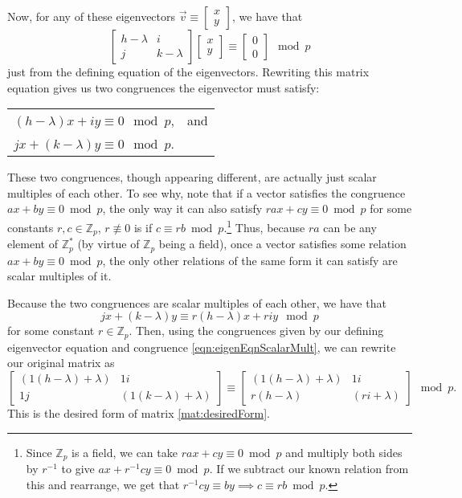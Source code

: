 \documentclass[a4paper, 12pt, reqno]{amsart}
\newcommand{\Z}{\mathbb{Z}}
\newcommand\smallmat[1]{\left[\begin{smallmatrix}#1\end{smallmatrix}\right]}
\begin{document}
	Now, for any of these eigenvectors $\vec{v} \equiv \smallmat{x\\y}$, we have that
	\[
		\begin{bmatrix}h-\lambda & i \\ j & k-\lambda\end{bmatrix}
		\begin{bmatrix}x \\ y\end{bmatrix}
		\equiv
		\begin{bmatrix}0 \\ 0\end{bmatrix}
		\mod{p}
	\]
	just from the defining equation of the eigenvectors. Rewriting this matrix equation gives us two congruences the eigenvector must satisfy:
	\begin{center}
		\begin{tabular}{rl}
			$(h - \lambda)x + iy  \equiv 0 \mod{p}$, & \quad and \\
			$jx + (k - \lambda)y \equiv 0 \mod{p}$. &
		\end{tabular}
	\end{center}
	These two congruences, though appearing different, are actually just scalar multiples of each other. To see why, note that if a vector satisfies the congruence 
	$ax + by \equiv 0 \bmod{p}$, the only way it can also satisfy $rax + cy \equiv 0 \bmod{p}$ for some constants $r, c \in \Z_p$, $r \not\equiv 0$ is if 
	$c \equiv rb \bmod{p}$.\footnote{Since $\Z_p$ is a field, we can take $rax + cy \equiv 0 \bmod{p}$ and multiply both sides by $r^{-1}$ to give 
	$ax + r^{-1}cy \equiv 0 \bmod{p}$. If we subtract our known relation from this and rearrange, we get that $r^{-1}cy \equiv by \implies c \equiv rb \bmod{p}$.} Thus, 
	because $ra$ can be any element of $\Z_p^*$ (by virtue of $\Z_p$ being a field), once a vector satisfies some relation $ax + by \equiv 0 \bmod{p}$, the only other 
	relations of the same form it can satisfy are scalar multiples of it.
	
	Because the two congruences are scalar multiples of each other, we have that
	\begin{equation}
		\label{eqn:eigenEqnScalarMult}
		jx + (k - \lambda)y \equiv r(h - \lambda)x + riy \mod{p}
	\end{equation}
	for some constant $r \in \Z_p$. Then, using the congruences given by our defining eigenvector equation and congruence \ref{eqn:eigenEqnScalarMult}, we can rewrite our
	original matrix as
	\[
		\begin{bmatrix}
			(1(h - \lambda) + \lambda) & 1i \\
			1j & (1(k - \lambda) + \lambda)
		\end{bmatrix} 
		\equiv
		\begin{bmatrix}
			(1(h - \lambda) + \lambda) & 1i \\
			r(h - \lambda) & (ri + \lambda)
		\end{bmatrix}
		\mod{p}.
	\]
	This is the desired form of matrix \ref{mat:desiredForm}. 
	
\end{document}
